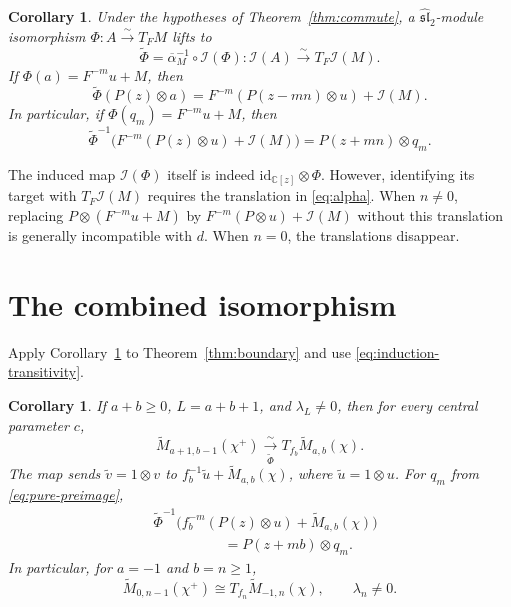 \documentclass[11pt]{article}
\newcommand{\C}{\mathbb C}
\newcommand{\g}{\widehat{\mathfrak{sl}}_2}
\newcommand{\I}{\mathcal I}
\newtheorem{corollary}[theorem]{Corollary}
\theoremstyle{definition}
\begin{document}
\begin{corollary}\label{cor:lift}
Under the hypotheses of Theorem~\ref{thm:commute}, a \(\g\)-module
isomorphism \(\Phi:A\xrightarrow{\sim}T_FM\) lifts to
\[
 \widetilde\Phi=\overline\alpha_M^{-1}\circ\I(\Phi):
 \I(A)\xrightarrow{\sim}T_F\I(M).
\]
If \(\Phi(a)=F^{-m}u+M\), then
\begin{equation}\label{eq:lift}
 \widetilde\Phi(P(z)\otimes a)
 =F^{-m}(P(z-mn)\otimes u)+\I(M).
\end{equation}
In particular, if \(\Phi(q_m)=F^{-m}u+M\), then
\begin{equation}\label{eq:poly-preimage}
 \boxed{\ 
 \widetilde\Phi^{-1}\bigl(F^{-m}(P(z)\otimes u)+\I(M)\bigr)
 =P(z+mn)\otimes q_m.\ }
\end{equation}
\end{corollary}

The induced map \(\I(\Phi)\) itself is indeed
\(\mathrm{id}_{\C[z]}\otimes\Phi\). However, identifying its target
with \(T_F\I(M)\) requires the translation in \eqref{eq:alpha}.
When \(n\ne0\), replacing \(P\otimes(F^{-m}u+M)\) by
\(F^{-m}(P\otimes u)+\I(M)\) without this translation is generally
incompatible with \(d\). When \(n=0\), the translations disappear.

\section{The combined isomorphism}

Apply Corollary~\ref{cor:lift} to Theorem~\ref{thm:boundary} and use
\eqref{eq:induction-transitivity}.

\begin{corollary}\label{cor:final}
If \(a+b\ge0\), \(L=a+b+1\), and \(\lambda_L\ne0\), then for every
central parameter \(c\),
\begin{equation}\label{eq:full-iso}
 \boxed{\ 
 \widetilde M_{a+1,b-1}(\chi^+)
 \xrightarrow[\ \widetilde\Phi\ ]{\ \sim\ }
 T_{f_b}\widetilde M_{a,b}(\chi).\ }
\end{equation}
The map sends \(\widetilde v=1\otimes v\) to
\(f_b^{-1}\widetilde u+\widetilde M_{a,b}(\chi)\), where
\(\widetilde u=1\otimes u\). For \(q_m\) from
\eqref{eq:pure-preimage},
\begin{equation}\label{eq:full-preimage}
\begin{aligned}
 &\widetilde\Phi^{-1}
 \bigl(f_b^{-m}(P(z)\otimes u)+\widetilde M_{a,b}(\chi)\bigr)\\
 &\hspace{5em}=P(z+mb)\otimes q_m.
\end{aligned}
\end{equation}
In particular, for \(a=-1\) and \(b=n\ge1\),
\[
 \widetilde M_{0,n-1}(\chi^+)
 \cong T_{f_n}\widetilde M_{-1,n}(\chi),
 \qquad\lambda_n\ne0.
\]
\end{corollary}
\end{document}
